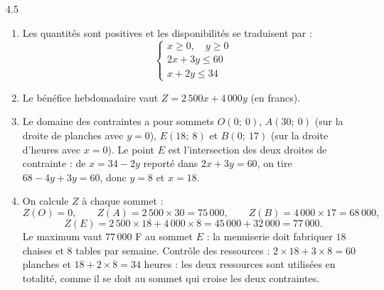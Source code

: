 \begin{corrige}{4.5}
\begin{enumerate}
\item Les quantités sont positives et les disponibilités se traduisent par :
\[
\begin{cases}
x \geqslant 0,\quad y \geqslant 0\\
2x + 3y \leqslant 60\\
x + 2y \leqslant 34
\end{cases}
\]
\item Le bénéfice hebdomadaire vaut $Z = 2\,500x + 4\,000y$ (en francs).
\item Le domaine des contraintes a pour sommets $O(0;\ 0)$, $A(30;\ 0)$ (sur la droite de planches avec $y = 0$), $E(18;\ 8)$ et $B(0;\ 17)$ (sur la droite d'heures avec $x = 0$). Le point $E$ est l'intersection des deux droites de contrainte : de $x = 34 - 2y$ reporté dans $2x + 3y = 60$, on tire $68 - 4y + 3y = 60$, donc $y = 8$ et $x = 18$.
\item On calcule $Z$ à chaque sommet :
\[
Z(O) = 0, \qquad Z(A) = 2\,500 \times 30 = 75\,000, \qquad Z(B) = 4\,000 \times 17 = 68\,000,
\]
\[
Z(E) = 2\,500 \times 18 + 4\,000 \times 8 = 45\,000 + 32\,000 = 77\,000 .
\]
Le maximum vaut $77\,000$ F au sommet $E$ : la menuiserie doit fabriquer $18$ chaises et $8$ tables par semaine. Contrôle des ressources : $2 \times 18 + 3 \times 8 = 60$ planches et $18 + 2 \times 8 = 34$ heures : les deux ressources sont utilisées en totalité, comme il se doit au sommet qui croise les deux contraintes.
\end{enumerate}
\end{corrige}
